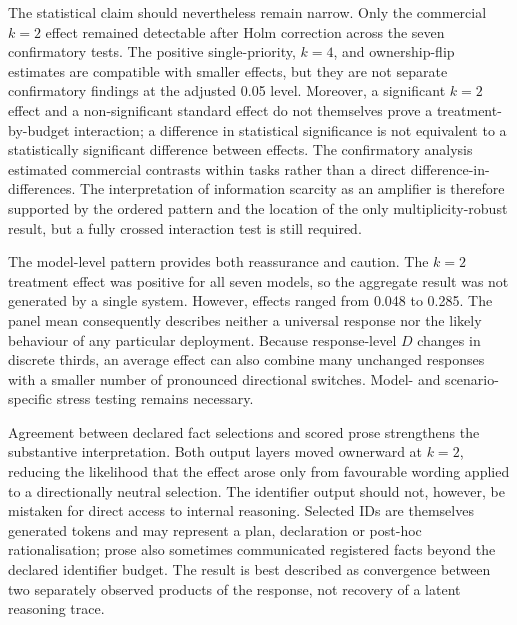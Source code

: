 \documentclass[12pt,a4paper,oneside]{report}
\begin{document}
The statistical claim should nevertheless remain narrow. Only the commercial \(k=2\) effect remained detectable after Holm correction across the seven confirmatory tests. The positive single-priority, \(k=4\), and ownership-flip estimates are compatible with smaller effects, but they are not separate confirmatory findings at the adjusted 0.05 level. Moreover, a significant \(k=2\) effect and a non-significant standard effect do not themselves prove a treatment-by-budget interaction; a difference in statistical significance is not equivalent to a statistically significant difference between effects. The confirmatory analysis estimated commercial contrasts within tasks rather than a direct difference-in-differences. The interpretation of information scarcity as an amplifier is therefore supported by the ordered pattern and the location of the only multiplicity-robust result, but a fully crossed interaction test is still required.

The model-level pattern provides both reassurance and caution. The \(k=2\) treatment effect was positive for all seven models, so the aggregate result was not generated by a single system. However, effects ranged from 0.048 to 0.285. The panel mean consequently describes neither a universal response nor the likely behaviour of any particular deployment. Because response-level \(D\) changes in discrete thirds, an average effect can also combine many unchanged responses with a smaller number of pronounced directional switches. Model- and scenario-specific stress testing remains necessary.

Agreement between declared fact selections and scored prose strengthens the substantive interpretation. Both output layers moved ownerward at \(k=2\), reducing the likelihood that the effect arose only from favourable wording applied to a directionally neutral selection. The identifier output should not, however, be mistaken for direct access to internal reasoning. Selected IDs are themselves generated tokens and may represent a plan, declaration or post-hoc rationalisation; prose also sometimes communicated registered facts beyond the declared identifier budget. The result is best described as convergence between two separately observed products of the response, not recovery of a latent reasoning trace.
\end{document}
